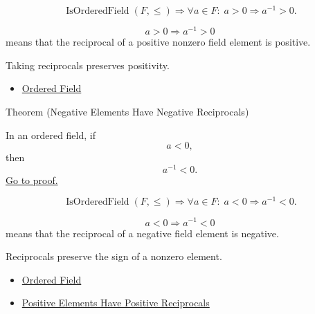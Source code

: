 \begin{remark*}
\[
\operatorname{IsOrderedField}(F,\leq)
\Longrightarrow
\forall a\in F{:}\; a>0 \Longrightarrow a^{-1}>0.
\]
\end{remark*}

\begin{remark*}
\[
a>0
\Longrightarrow
a^{-1}>0
\]
means that the reciprocal of a positive nonzero field element is positive.
\end{remark*}

\begin{remark*}[Interpretation]
Taking reciprocals preserves positivity.
\end{remark*}

\begin{dependencies}
\begin{itemize}
  \item \hyperref[def:ordered-field]{Ordered Field}
\end{itemize}
\end{dependencies}

\begin{theorembox}{Theorem (Negative Elements Have Negative Reciprocals)}
\begin{theorem}\label{thm:ordered-field-negative-reciprocals}
In an ordered field, if
\[
a<0,
\]
then
\[
a^{-1}<0.
\]
\hyperref[prf:ordered-field-negative-reciprocals]{Go to proof.}
\end{theorem}
\end{theorembox}

\begin{remark*}
\[
\operatorname{IsOrderedField}(F,\leq)
\Longrightarrow
\forall a\in F{:}\; a<0 \Longrightarrow a^{-1}<0.
\]
\end{remark*}

\begin{remark*}
\[
a<0
\Longrightarrow
a^{-1}<0
\]
means that the reciprocal of a negative field element is negative.
\end{remark*}

\begin{remark*}[Interpretation]
Reciprocals preserve the sign of a nonzero element.
\end{remark*}

\begin{dependencies}
\begin{itemize}
  \item \hyperref[def:ordered-field]{Ordered Field}
  \item \hyperref[thm:ordered-field-positive-reciprocals]{Positive Elements Have Positive Reciprocals}
\end{itemize}
\end{dependencies}

